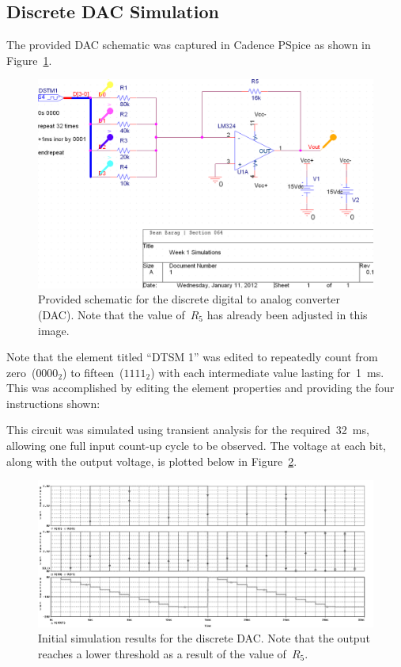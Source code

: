 \subsection{Discrete DAC Simulation}
The provided DAC schematic was captured in Cadence PSpice as shown in
Figure~\ref{f:dac_schem}.
%
\begin{figure}[H]
\centering
	\includegraphics[width=.8\textwidth]{img/shot/part1_schem_cropped.PNG}
	\parbox{.8\textwidth}{
	\caption[Discrete DAC --- Schematic]{Provided schematic for the discrete
	digital to analog converter (DAC).  Note that the value of~$R_5$ has
	already been adjusted in this image.}
	\label{f:dac_schem}}
\end{figure}
%
Note that the element titled ``DTSM 1'' was edited to repeatedly count from
zero~($0000_2$) to fifteen~($1111_2$) with each intermediate value
lasting for~\SI{1}{\milli\second}.  This was accomplished by editing the
element properties and providing the four instructions shown:
%
\begin{itemize*}
	\item {}
	\item {}
	\item {}
	\item {}
\end{itemize*}
%
This circuit was simulated using transient analysis for the
required~\SI{32}{\milli\second}, allowing one full input count-up cycle to be
observed.  The voltage at each bit, along with the output voltage, is plotted
below in Figure~\ref{f:dac_plot1}.
%
\begin{figure}[H]
\centering
	\includegraphics[width=.8\textwidth]{img/plot/part1_plot1b.PNG}
	\parbox{.8\textwidth}{
	\caption[Discrete DAC --- Initial Results]{Initial simulation results for
	the discrete DAC.  Note that the output reaches a lower threshold as a
	result of the value of~$R_5$.}
	\label{f:dac_plot1}}
\end{figure}

